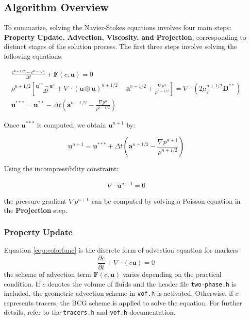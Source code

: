 \documentclass[a4paper]{article}
\begin{document}
\subsection{Algorithm Overview}
To summarize, solving the Navier-Stokes equations involves four main steps: \textbf{Property Update, Advection, Viscosity, and Projection}, corresponding to distinct stages of the solution process. The first three steps involve solving the following equations:

\begin{gather}
    \frac{c^{n+1/2} - c^{n-1/2}}{\Delta t} 
    + \mathbf{F}(c,\mathbf{u}) = 0 \label{equ:colorfunc} \\
    \rho^{n+1/2} \left[ \frac{\mathbf{u}^{**} - \mathbf{u}^n}{\Delta t} 
    + \nabla \cdot (\mathbf{u} \otimes \mathbf{u})^{n+1/2} 
    - \mathbf{a}^{n-1/2} 
    + \frac{\nabla p^n}{\rho^{n-1/2}} \right] 
    = \nabla \cdot \left( 2\mu^{n+1/2}_f \mathbf{D}^{**} \right)\label{equ:advdiff}\\
    \mathbf{u}^{***} = \mathbf{u}^{**} 
    - \Delta t \left( \mathbf{a}^{n-1/2} 
    - \frac{\nabla p^n}{\rho^{n-1/2}} \right)\label{equ:diffalter}
\end{gather}

Once $\mathbf{u}^{***}$ is computed, we obtain $\mathbf{u}^{n+1}$ by:

\begin{equation}
    \mathbf{u}^{n+1} = \mathbf{u}^{***} 
    + \Delta t \left( \mathbf{a}^{n+1/2} 
    - \frac{\nabla p^{n+1}}{\rho^{n+1/2}} \right)
\end{equation}

Using the incompressibility constraint:

\begin{gather}
    \nabla \cdot \mathbf{u}^{n+1} = 0
\end{gather}

the pressure gradient $\nabla p^{n+1}$ can be computed by solving a Poisson equation in the \textbf{Projection} step.

\subsubsection{Property Update}
Equation \ref{equ:colorfunc} is the discrete form of advection equation for markers
\begin{equation}
    \frac{\partial c}{\partial t} + \nabla\cdot(c\mathbf{u}) = 0
\end{equation}
the scheme of advection term $\mathbf{F}(c,\mathbf{u})$ varies depending on the practical condition. If $c$ denotes the volume of fluids and the header file \texttt{two-phase.h} is included, the geometric advection scheme in \texttt{vof.h} is activated. Otherwise, if $c$ represents tracers, the BCG scheme is applied to solve the equation. For further details, refer to the \texttt{tracers.h} and \texttt{vof.h} documentation.
\end{document}
